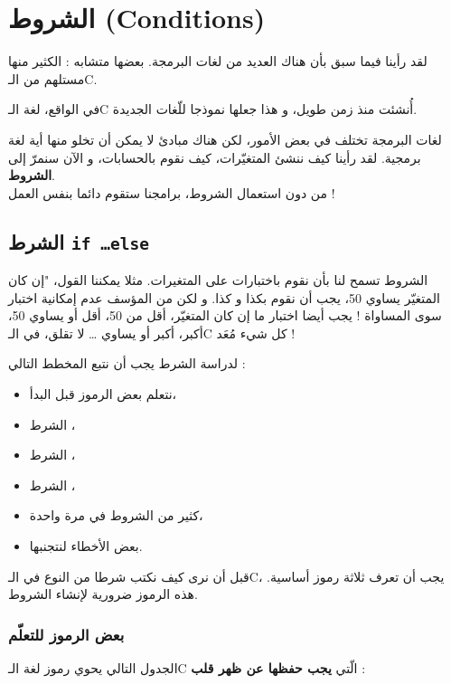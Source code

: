 \chapter{الشروط (\textenglish{Conditions})}

لقد رأينا فيما سبق بأن هناك العديد من لغات البرمجة. بعضها متشابه : الكثير منها مستلهم من الـ\textenglish{C}.

في الواقع، لغة  الـ\textenglish{C}
أُنشئت منذ زمن طويل، و هذا جعلها نموذجا للّغات الجديدة.

لغات البرمجة تختلف في بعض الأمور، لكن هناك مبادئ لا يمكن أن تخلو منها أية لغة برمجية. لقد رأينا كيف ننشئ المتغيّرات، كيف نقوم بالحسابات، و الآن سنمرّ إلى 
\textbf{الشروط}.\\
من دون استعمال الشروط، برامجنا ستقوم دائما بنفس العمل !

\section{الشرط \texttt{if \dots else}}

الشروط تسمح لنا بأن نقوم باختبارات على المتغيرات. مثلا يمكننا القول، "إن كان المتغيّر 
يساوي 50، يجب أن نقوم بكذا و كذا. و لكن من المؤسف عدم إمكانية اختبار سوى المساواة ! يجب أيضا اختبار ما إن كان المتغيّر، أقل من 50، أقل أو يساوي 50، أكبر، أكبر أو يساوي
\dots
لا تقلق، في الـ\textenglish{C}
كل شيء مُعَد !

لدراسة الشرط 
يجب أن نتبع المخطط التالي :

\begin{itemize}
\item نتعلم بعض الرموز قبل البدأ،
\item الشرط 
،
\item الشرط 
،
\item الشرط
،
\item كثير من الشروط في مرة واحدة،
\item بعض الأخطاء لنتجنبها.
\end{itemize}

قبل أن نرى كيف نكتب شرطا من النوع
في الـ\textenglish{C}، يجب أن تعرف ثلاثة رموز أساسية. هذه الرموز ضرورية لإنشاء الشروط.

\subsection{بعض الرموز للتعلّم}

الجدول التالي يحوي رموز لغة الـ\textenglish{C} الّتي
\textbf{يجب حفظها عن ظهر قلب} :

